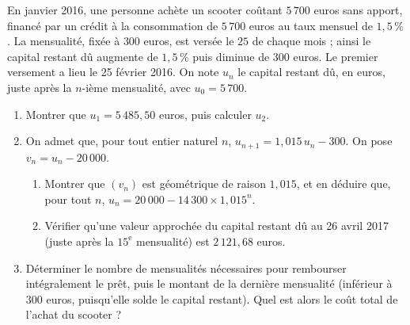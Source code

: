 \begin{annales}
En janvier 2016, une personne achète un scooter coûtant $5\,700$ euros sans
apport, financé par un crédit à la consommation de $5\,700$ euros au taux
mensuel de $1{,}5\,\%$. La mensualité, fixée à $300$ euros, est versée le
$25$ de chaque mois ; ainsi le capital restant dû augmente de $1{,}5\,\%$
puis diminue de $300$ euros. Le premier versement a lieu le 25 février 2016.
On note $u_{n}$ le capital restant dû, en euros, juste après la $n$-ième
mensualité, avec $u_{0} = 5\,700$.
\begin{enumerate}[label=\textbf{\arabic*.}, leftmargin=*, itemsep=0.2em]
  \item Montrer que $u_{1} = 5\,485{,}50$ euros, puis calculer $u_{2}$.
  \item On admet que, pour tout entier naturel $n$,
        $u_{n+1} = 1{,}015\,u_{n}-300$. On pose $v_{n} = u_{n}-20\,000$.
        \begin{enumerate}[label=\textbf{\alph*)}, leftmargin=1.2em]
          \item Montrer que $(v_{n})$ est géométrique de raison $1{,}015$, et
                en déduire que, pour tout $n$,
                $u_{n} = 20\,000-14\,300\times1{,}015^{n}$.
          \item Vérifier qu'une valeur approchée du capital restant dû au
                26 avril 2017 (juste après la $15^{\text{e}}$ mensualité) est
                $2\,121{,}68$ euros.
        \end{enumerate}
  \item Déterminer le nombre de mensualités nécessaires pour rembourser
        intégralement le prêt, puis le montant de la dernière mensualité
        (inférieur à $300$ euros, puisqu'elle solde le capital restant).
        Quel est alors le coût total de l'achat du scooter ?
\end{enumerate}
\end{annales}

